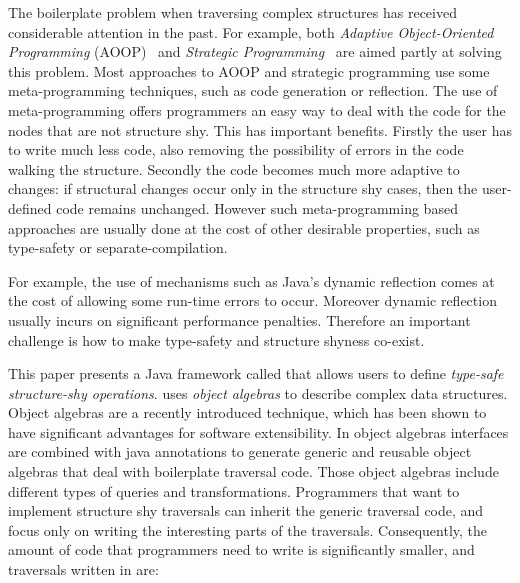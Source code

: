 The boilerplate problem when traversing complex structures has received
considerable attention in the past. For example, both \emph{Adaptive
  Object-Oriented Programming} (AOOP)~\cite{DemeterBook} and
\emph{Strategic
  Programming}~\cite{borovansky1996elan,visser1998core,vandenBrand:2003:TRT:941566.941568}
are aimed partly at solving this problem. Most approaches to AOOP and
strategic programming use some meta-programming techniques, such as
code generation or reflection. The use of meta-programming offers
programmers an easy way to deal with the code for the nodes that are
not structure shy. This has important benefits. Firstly the user has
to write much less code, also removing the possibility of errors in
the code walking the structure. Secondly the code becomes much more
adaptive to changes: if structural changes occur only in the structure
shy cases, then the user-defined code remains unchanged.  However such
meta-programming based approaches are usually done at the cost of
other desirable properties, such as type-safety or
separate-compilation.

For example,
the use of mechanisms such as Java's dynamic reflection comes at the
cost of allowing some run-time errors to occur. Moreover dynamic
reflection usually incurs on significant performance penalties.
Therefore an important challenge is how to make type-safety and structure 
shyness co-exist.

This paper presents a Java framework called \name that allows users to
define \emph{type-safe structure-shy operations}. \name uses
\emph{object algebras} to describe complex data structures. Object
algebras are a recently introduced technique, which has been shown to
have significant advantages for software extensibility.  In \name
object algebras interfaces are combined with java annotations to
generate generic and reusable object algebras that deal with
boilerplate traversal code.  Those object algebras include different
types of queries and transformations.  Programmers
that want to implement structure shy traversals can inherit the
generic traversal code, and focus only on writing the interesting
parts of the traversals. Consequently, the amount of code that
programmers need to write is significantly smaller, and traversals
written in \name are:

